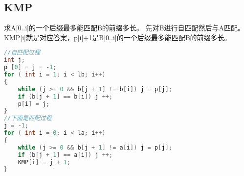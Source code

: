 \subsection{KMP}
	求A[0..i]的一个后缀最多能匹配B的前缀多长。
	先对B进行自匹配然后与A匹配。
	KMP[i]就是对应答案，p[i]+1是B[0..i]的一个后缀最多能匹配B的前缀多长。
	\begin{lstlisting}[language=c++]
//自匹配过程
int j;
p [0] = j = -1;
for ( int i = 1; i < lb; i++)
{
	while (j >= 0 && b[j + 1] != b[i]) j = p[j];
	if (b[j + 1] == b[i]) j ++;
	p[i] = j;
}
//下面是匹配过程
j = -1;
for ( int i = 0; i < la; i++)
{
	while (j >= 0 && b[j + 1] != a[i]) j = p[j];
	if (b[j + 1] == a[i]) j ++;
	KMP[i] = j + 1;
}
	\end{lstlisting} 